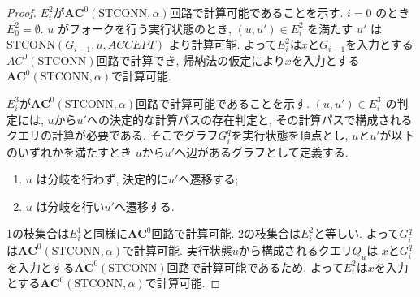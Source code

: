 \documentclass[11pt,a4paper]{jsarticle}
\theoremstyle{definition}
\theoremstyle{remark}
\newcommand{\classfont}{\mathbf}
\newcommand{\AC}{\classfont{AC}}
\newcommand{\probfont}{\text}
\newcommand{\STCONN}{\probfont{STCONN}}
\begin{document}
\begin{proof}
 $E^2_i$が$\AC^0(\STCONN, \alpha)$回路で計算可能であることを示す.
 $i=0$ のとき $E^2_0 = \emptyset$.
 $u$ がフォークを行う実行状態のとき,
 $(u, u') \in E^2_i$ を満たす $u'$ は
 $\STCONN(G_{i-1}, u, ACCEPT)$ より計算可能.
 よって$E^2_i$は$x$と$G_{i-1}$を入力とする$AC^0(\STCONN)$回路で計算でき,
 帰納法の仮定により$x$を入力とする$\AC^0(\STCONN, \alpha)$で計算可能.


 $E^3_i$が$\AC^0(\STCONN, \alpha)$回路で計算可能であることを示す.
 $(u, u') \in E^3_i$ の判定には, $u$から$u'$への決定的な計算パスの存在判定と,
 その計算パスで構成されるクエリの計算が必要である.
 そこでグラフ$G^q_i$を実行状態を頂点とし, $u$と$u'$が以下のいずれかを満たすとき
 $u$から$u'$へ辺があるグラフとして定義する.
 \begin{enumerate}
 \item $u$ は分岐を行わず, 決定的に$u'$へ遷移する;
 \item $u$ は分岐を行い$u'$へ遷移する.
 \end{enumerate}
 1の枝集合は$E^1_i$と同様に$\AC^0$回路で計算可能.
 2の枝集合は$E^2_i$と等しい.
 よって$G^q_i$は$\AC^0(\STCONN, \alpha)$で計算可能.
 実行状態$u$から構成されるクエリ$Q_u$は
 $x$と$G^q_i$を入力とする$\AC^0(\STCONN)$回路で計算可能であるため,
 よって$E^2_i$は$x$を入力とする$\AC^0(\STCONN, \alpha)$で計算可能.
\end{proof}



\end{document}
